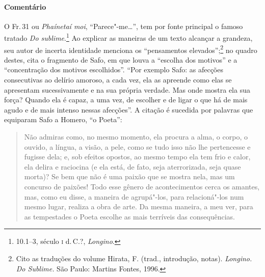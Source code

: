 {\paragraph{Comentário} O Fr.\,31 ou \emph{Phaínetaí moi}, ``Parece"-me\ldots{}'', tem por fonte
principal o famoso tratado \emph{Do sublime}.\footnote{10.1--3, século \textsc{i} d.\,C.?, \emph{Longino}.} Ao
explicar as maneiras de um texto alcançar a grandeza, seu autor de incerta identidade menciona os
``pensamentos elevados'';\footnote{ Cito as traduções do volume Hirata,
F. (trad., introdução, notas). \emph{Longino.} \emph{Do Sublime.} São
Paulo: Martins Fontes, 1996.} no quadro destes, cita o fragmento de Safo,
em que louva a ``escolha dos motivos'' e a ``concentração dos
motivos escolhidos''. ``Por exemplo Safo: as afecções consecutivas ao delírio
amoroso, a cada vez, ela as apreende como elas se apresentam sucessivamente e
na sua própria verdade. Mas onde mostra ela sua força? Quando ela é capaz, a
uma vez, de escolher e de ligar o que há de mais agudo e de mais
intenso nessas afecções''. A citação é sucedida por palavras que equiparam Safo
a Homero, ``o Poeta'': 

\begin{quote}
Não admiras como, no mesmo momento, ela
procura a alma, o corpo, o ouvido, a língua, a visão, a pele, como se tudo isso
não lhe pertencesse e fugisse dela; e, sob efeitos opostos, ao mesmo tempo ela
tem frio e calor, ela delira e raciocina (e ela está, de fato, seja
aterrorizada, seja quase morta)? Se bem que não é uma paixão que se mostra
nela, mas um concurso de paixões! Todo esse gênero de acontecimentos cerca os
amantes, mas, como eu disse, a maneira de agrupá"-los, para relacioná"-los num
mesmo lugar, realiza a obra de arte. Da mesma maneira, a meu ver, para as
tempestades o Poeta escolhe as mais terríveis das consequências.
\end{quote}

}
